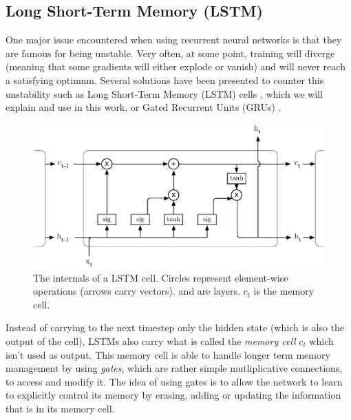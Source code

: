 \subsection{Long Short-Term Memory (LSTM)}
One major issue encountered when using recurrent neural networks is that they
are famous for being unstable. Very often, at some point, training will diverge
(meaning that some gradients will either explode or vanish)
and will never reach a satisfying optimum. Several solutions have been presented
to counter this unstability such as Long Short-Term Memory (LSTM)
cells \cite{lstm}, which we will explain and use in this work, or Gated
Recurrent Units (GRUs) \cite{grus}. \\

\begin{figure}[H]
	\centering
	\includegraphics[width=0.8\linewidth]{fig/lstm.eps}
	\caption{The internals of a LSTM cell. Circles represent element-wise
	operations (arrows carry vectors).  and 
	 are layers. $c_t$ is the memory cell.}
	\label{fig:lstm}
\end{figure}

Instead of carrying to the next timestep only the hidden state (which is also
the output of the cell), LSTMs also carry what is called the
\textit{memory cell} $c_t$ which isn't used as output. This memory cell is 
able to handle longer term memory management by using \textit{gates}, which
are rather simple mutliplicative connections, to 
access and modify it. The idea of using gates is to allow the network
to learn to explicitly control its memory by erasing, adding or updating the
information that is in its memory cell.

